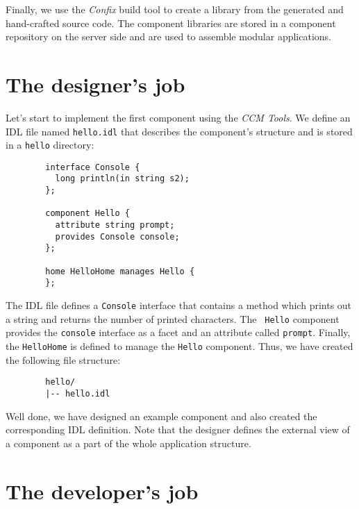Finally, we use the {\it Confix} build tool to create a library from the
generated and hand-crafted source code. The component libraries are stored in a
component repository on the server side and are used to assemble modular
applications.



\section{The designer's job}

Let's start to implement the first component using the {\it CCM Tools}. We
define an IDL file named {\tt hello.idl} that describes the component's
structure and is stored in a {\tt hello} directory:
\begin{verbatim}
        interface Console {
          long println(in string s2);
        };

        component Hello {
          attribute string prompt;	
          provides Console console;
        };

        home HelloHome manages Hello {
        };
\end{verbatim}

The IDL file defines a {\tt Console} interface that contains a method which
prints out a string and returns the number of printed characters. The {\tt
Hello} component provides the {\tt console} interface as a facet and an
attribute called {\tt prompt}. Finally, the {\tt HelloHome} is defined to manage
the {\tt Hello} component. Thus, we have created the following file structure:
\begin{verbatim}
        hello/
        |-- hello.idl
\end{verbatim}

Well done, we have designed an example component and also created the
corresponding IDL definition. Note that the designer defines the external view
of a component as a part of the whole application structure.



\section{The developer's job}

